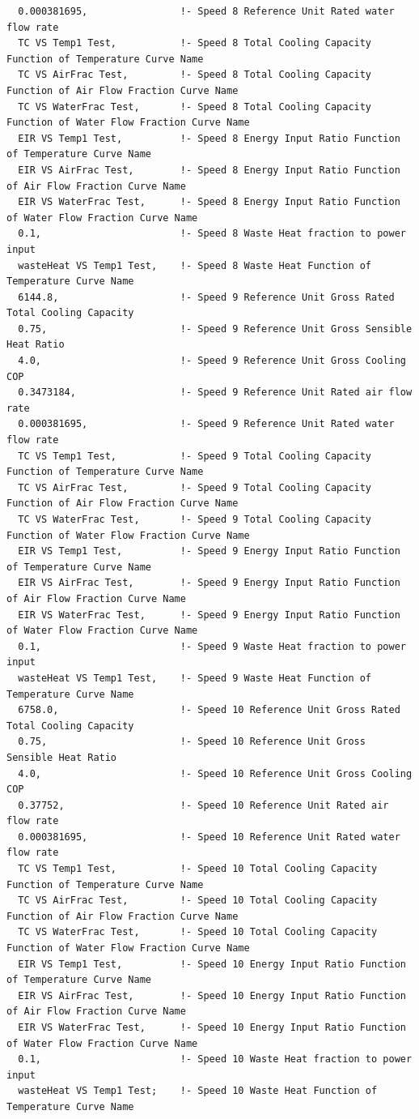 \begin{lstlisting}
  0.000381695,                !- Speed 8 Reference Unit Rated water flow rate
  TC VS Temp1 Test,           !- Speed 8 Total Cooling Capacity Function of Temperature Curve Name
  TC VS AirFrac Test,         !- Speed 8 Total Cooling Capacity Function of Air Flow Fraction Curve Name
  TC VS WaterFrac Test,       !- Speed 8 Total Cooling Capacity Function of Water Flow Fraction Curve Name
  EIR VS Temp1 Test,          !- Speed 8 Energy Input Ratio Function of Temperature Curve Name
  EIR VS AirFrac Test,        !- Speed 8 Energy Input Ratio Function of Air Flow Fraction Curve Name
  EIR VS WaterFrac Test,      !- Speed 8 Energy Input Ratio Function of Water Flow Fraction Curve Name
  0.1,                        !- Speed 8 Waste Heat fraction to power input
  wasteHeat VS Temp1 Test,    !- Speed 8 Waste Heat Function of Temperature Curve Name
  6144.8,                     !- Speed 9 Reference Unit Gross Rated Total Cooling Capacity
  0.75,                       !- Speed 9 Reference Unit Gross Sensible Heat Ratio
  4.0,                        !- Speed 9 Reference Unit Gross Cooling COP
  0.3473184,                  !- Speed 9 Reference Unit Rated air flow rate
  0.000381695,                !- Speed 9 Reference Unit Rated water flow rate
  TC VS Temp1 Test,           !- Speed 9 Total Cooling Capacity Function of Temperature Curve Name
  TC VS AirFrac Test,         !- Speed 9 Total Cooling Capacity Function of Air Flow Fraction Curve Name
  TC VS WaterFrac Test,       !- Speed 9 Total Cooling Capacity Function of Water Flow Fraction Curve Name
  EIR VS Temp1 Test,          !- Speed 9 Energy Input Ratio Function of Temperature Curve Name
  EIR VS AirFrac Test,        !- Speed 9 Energy Input Ratio Function of Air Flow Fraction Curve Name
  EIR VS WaterFrac Test,      !- Speed 9 Energy Input Ratio Function of Water Flow Fraction Curve Name
  0.1,                        !- Speed 9 Waste Heat fraction to power input
  wasteHeat VS Temp1 Test,    !- Speed 9 Waste Heat Function of Temperature Curve Name
  6758.0,                     !- Speed 10 Reference Unit Gross Rated Total Cooling Capacity
  0.75,                       !- Speed 10 Reference Unit Gross Sensible Heat Ratio
  4.0,                        !- Speed 10 Reference Unit Gross Cooling COP
  0.37752,                    !- Speed 10 Reference Unit Rated air flow rate
  0.000381695,                !- Speed 10 Reference Unit Rated water flow rate
  TC VS Temp1 Test,           !- Speed 10 Total Cooling Capacity Function of Temperature Curve Name
  TC VS AirFrac Test,         !- Speed 10 Total Cooling Capacity Function of Air Flow Fraction Curve Name
  TC VS WaterFrac Test,       !- Speed 10 Total Cooling Capacity Function of Water Flow Fraction Curve Name
  EIR VS Temp1 Test,          !- Speed 10 Energy Input Ratio Function of Temperature Curve Name
  EIR VS AirFrac Test,        !- Speed 10 Energy Input Ratio Function of Air Flow Fraction Curve Name
  EIR VS WaterFrac Test,      !- Speed 10 Energy Input Ratio Function of Water Flow Fraction Curve Name
  0.1,                        !- Speed 10 Waste Heat fraction to power input
  wasteHeat VS Temp1 Test;    !- Speed 10 Waste Heat Function of Temperature Curve Name
\end{lstlisting}

